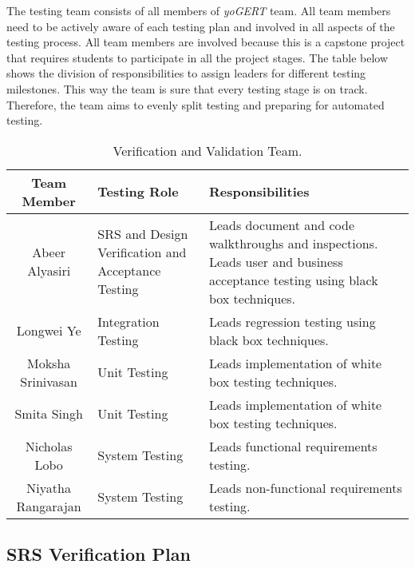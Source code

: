 \documentclass[12pt, titlepage]{article}
\begin{document}
The testing team consists of all members of \emph{yoGERT} team. All team members need to be actively aware of each testing plan and involved in all aspects of the testing process. All team members are involved because this is a capstone project that requires students to participate in all the project stages. The table below shows the division of responsibilities to assign leaders for different testing milestones. This way the team is sure that every testing stage is on track. Therefore, the team aims to evenly split testing and preparing for automated testing. 
\newpage
\begin{table}[h!]
    \begin{tabular}{|c|p{50mm}|p{50mm}| }
 \hline
 \textbf{Team Member} & \textbf{Testing Role} & \textbf{Responsibilities}  \\ 
 \hline
 Abeer Alyasiri & SRS and Design Verification and Acceptance Testing & Leads document and code walkthroughs and inspections. Leads user and business acceptance testing using black box techniques. \\ 
 Longwei Ye & Integration Testing & Leads regression testing using black box techniques. \\ 
 Moksha Srinivasan & Unit Testing & Leads implementation of white box testing techniques. \\
 Smita Singh & Unit Testing & Leads implementation of white box testing techniques. \\
 Nicholas Lobo & System Testing & Leads functional requirements testing. \\
 Niyatha Rangarajan & System Testing & Leads non-functional requirements testing. \\
 \hline
\end{tabular}
    \caption{Verification and Validation Team.}
    \label{tab:my_label}
\end{table}

\subsection{SRS Verification Plan}
\end{document}
